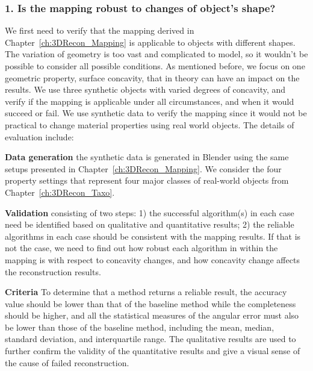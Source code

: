 \subsubsection{1. Is the mapping robust to changes of object's shape?}
We first need to verify that the mapping derived in Chapter~\ref{ch:3DRecon_Mapping} is applicable to objects with different shapes. The variation of geometry is too vast and complicated to model, so it wouldn't be possible to consider all possible conditions. As mentioned before, we focus on one geometric property, surface concavity, that in theory can have an impact on the results. We use three synthetic objects with varied degrees of concavity, and verify if the mapping is applicable under all circumstances, and when it would succeed or fail. We use synthetic data to verify the mapping since it would not be practical to change material properties using real world objects. The details of evaluation include:


\noindent\textbf{Data generation} the synthetic data is generated in Blender using the same setups presented in Chapter~\ref{ch:3DRecon_Mapping}. We consider the four property settings that represent four major classes of real-world objects from Chapter~\ref{ch:3DRecon_Taxo}.


\noindent\textbf{Validation} consisting of two steps: 1) the successful algorithm(s) in each case need be identified based on qualitative and quantitative results; 2) the reliable algorithms in each case should be consistent with the mapping results. If that is not the case, we need to find out how robust each algorithm in within the mapping is with respect to concavity changes, and how concavity change affects the reconstruction results.

\noindent\textbf{Criteria} To determine that a method returns a reliable result, the accuracy value should be lower than that of the baseline method while the completeness should be higher, and all the statistical measures of the angular error must also be lower than those of the baseline method, including the mean, median, standard deviation, and interquartile range. The qualitative results are used to further confirm the validity of the quantitative results and give a visual sense of the cause of failed reconstruction.


